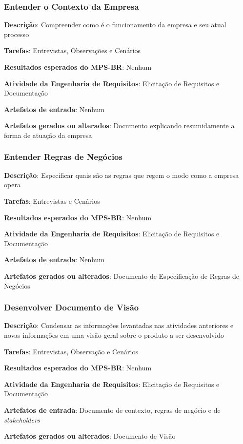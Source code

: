 \subsubsection{Entender o Contexto da Empresa}

\begin{description}
\item\textbf{Descrição}: Compreender como é o funcionamento da empresa e seu atual processo
\item\textbf{Tarefas}: Entrevistas, Observações e Cenários
\item\textbf{Resultados esperados do MPS-BR}: Nenhum
\item\textbf{Atividade da Engenharia de Requisitos}: Elicitação de Requisitos e Documentação
\item\textbf{Artefatos de entrada}: Nenhum
\item\textbf{Artefatos gerados ou alterados}: Documento explicando resumidamente a forma de atuação da empresa
\end{description}

\subsubsection{Entender Regras de Negócios}

\begin{description}
\item\textbf{Descrição}: Especificar quais são as regras que regem o modo como a empresa opera
\item\textbf{Tarefas}: Entrevistas e Cenários
\item\textbf{Resultados esperados do MPS-BR}: Nenhum
\item\textbf{Atividade da Engenharia de Requisitos}: Elicitação de Requisitos e Documentação
\item\textbf{Artefatos de entrada}: Nenhum
\item\textbf{Artefatos gerados ou alterados}: Documento de Especificação de Regras de Negócios
\end{description}

\subsubsection{Desenvolver Documento de Visão}

\begin{description}
\item\textbf{Descrição}: Condensar as informações levantadas nas atividades anteriores e novas informações em uma visão geral sobre o produto a ser desenvolvido
\item\textbf{Tarefas}: Entrevistas, Observação e Cenários
\item\textbf{Resultados esperados do MPS-BR}: Nenhum
\item\textbf{Atividade da Engenharia de Requisitos}: Elicitação de Requisitos e Documentação
\item\textbf{Artefatos de entrada}: Documento de contexto, regras de negócio e de \textit{stakeholders}
\item\textbf{Artefatos gerados ou alterados}: Documento de Visão
\end{description}

